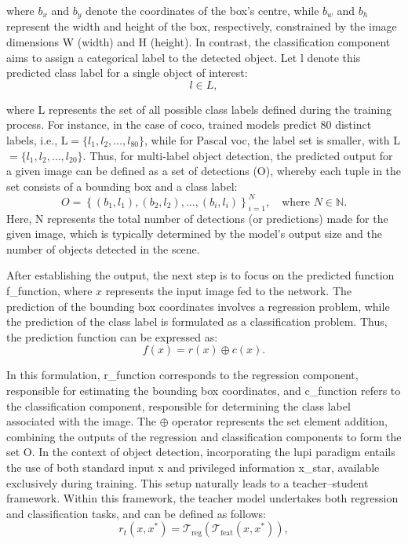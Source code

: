 \noindent where \( b_x \) and \( b_y \) denote the coordinates of the box's centre, while \( b_w \) and \( b_h \) represent the width and height of the box, respectively, constrained by the image dimensions \gls{W} (width) and \gls{H} (height).
In contrast, the classification component aims to assign a categorical label to the detected object. Let \gls{l} denote this predicted class label for a single object of interest:
\begin{equation}
\label{eq:classification_label}
l \in L,
\end{equation}

\noindent where \gls{L} represents the set of all possible class labels defined during the training process. For instance, in the case of \gls{coco}, trained models predict 80 distinct labels, i.e., \gls{L}$ = \{l_1, l_2, \dots, l_{80}\}$, while for Pascal \gls{voc}, the label set is smaller, with \gls{L}$ = \{l_1, l_2, \dots, l_{20}\}$.
Thus, for multi-label object detection, the predicted output for a given image can be defined as a set of detections (\gls{O}), whereby each tuple in the set consists of a bounding box and a class label:
\begin{equation}
\label{eq:multi_label_output}
O = \left\{ (b_1, l_1), (b_2, l_2), \ldots, (b_i, l_i) \right\}_{i=1}^{N}, \quad \text{where } N \in \mathbb{N} .
\end{equation}
Here, \gls{N} represents the total number of detections (or predictions) made for the given image, which is typically determined by the model's output size and the number of objects detected in the scene.

After establishing the output, the next step is to focus on the predicted function \gls{f_function}, where $x$ represents the input image fed to the network. The prediction of the bounding box coordinates involves a regression problem, while the prediction of the class label is formulated as a classification problem. Thus, the prediction function can be expressed as:
\begin{equation}
\label{eq:prediction_function}
f(x) = r(x) \oplus c(x) .
\end{equation}

\noindent In this formulation, \gls{r_function} corresponds to the regression component, responsible for estimating the bounding box coordinates, and \gls{c_function} refers to the classification component, responsible for determining the class label associated with the image. The \(\oplus\) operator represents the set element addition, combining the outputs of the regression and classification components to form the set \gls{O}.
In the context of object detection, incorporating the \gls{lupi} paradigm entails the use of both standard input \gls{x} and privileged information \gls{x_star}, available exclusively during training. This setup naturally leads to a teacher--student framework. Within this framework, the teacher model undertakes both regression and classification tasks, and can be defined as follows:
\begin{equation} \label{eq:teacher_network_reg}
r_t(x, x^*) = \mathcal{T}_{\text{reg}}(\mathcal{T}_{\text{feat}}(x, x^*)),
\end{equation}

